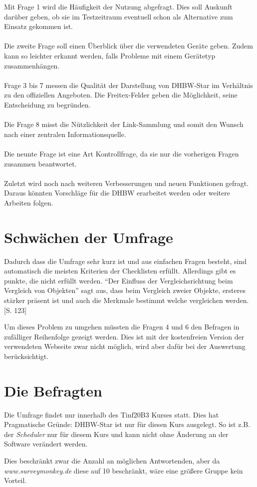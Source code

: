 Mit Frage 1 wird die Häufigkeit der Nutzung abgefragt. Dies soll Auskunft darüber geben, ob sie im Testzeitraum eventuell schon als Alternative zum Einsatz gekommen ist.
\\\\
Die zweite Frage soll einen Überblick über die verwendeten Geräte geben. Zudem kann so leichter erkannt werden, falls Probleme mit einem Gerätetyp zusammenhängen.
\\\\
Frage 3 bis 7 messen die Qualität der Darstellung von DHBW-Star im Verhältnis zu den offiziellen Angeboten. Die Freitex-Felder geben die Möglichkeit, seine Entscheidung zu begründen.
\\\\
Die Frage 8 misst die Nützlichkeit der Link-Sammlung und somit den Wunsch nach einer zentralen Informationsquelle.
\\\\
Die neunte Frage ist eine Art Kontrollfrage, da sie nur die vorherigen Fragen zusammen beantwortet.
\\\\
Zuletzt wird noch nach weiteren Verbesserungen und neuen Funktionen gefragt. Daraus könnten Vorschläge für die DHBW erarbeitet werden oder weitere Arbeiten folgen.
\\

\section{Schwächen der Umfrage \label{vergleichsproblem}}

Dadurch dass die Umfrage sehr kurz ist und aus einfachen Fragen besteht, sind automatisch die meisten Kriterien der Checklisten erfüllt. Allerdings gibt es punkte, die nicht erfüllt werden. "`Der Einfluss der Vergleichsrichtung beim Vergleich von Objekten"' sagt aus, dass beim Vergleich zweier Objekte, ersteres stärker präsent ist und auch die Merkmale bestimmt welche vergleichen werden. \cite{fragebogenRolf} [S. 123]

Um dieses Problem zu umgehen müssten die Fragen 4 und 6 den Befragen in zufälliger Reihenfolge gezeigt werden. Dies ist mit der kostenfreien Version der verwendeten Webseite zwar nicht möglich, wird aber dafür bei der Auswertung berücksichtigt.

\section{Die Befragten}
Die Umfrage findet nur innerhalb des Tinf20B3 Kurses statt. Dies hat Pragmatische Gründe: DHBW-Star ist nur für diesen Kurs ausgelegt. So ist z.B. der \emph{Scheduler} nur für diesem Kurs und kann nicht ohne Änderung an der Software verändert werden.

Dies beschränkt zwar die Anzahl an möglichen Antwortenden, aber da \emph{www.surveymonkey.de} diese auf 10 beschränkt, wäre eine größere Gruppe kein Vorteil.